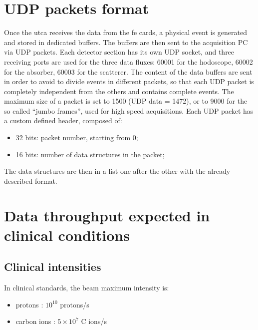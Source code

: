 \section{UDP packets format}\label{chapappA::sec::UDPpackForm}

Once the \gls{utca} receives the data from the \gls{fe} cards, a physical event is generated and stored in dedicated buffers. The buffers are then sent to the acquisition PC via UDP packets. Each detector section has its own UDP socket, and three receiving ports are used for the three data fluxes: 60001 for the hodoscope, 60002 for the absorber, 60003 for the scatterer. The content of the data buffers are sent in order to avoid to divide events in different packets, so that each UDP packet is completely independent from the others and contains complete events. The maximum size of a packet is set to 1500 (UDP data = 1472), or to 9000 for the so called \enquote{jumbo frames}, used for high speed acquisitions.\newline
Each UDP packet has a custom defined header, composed of:
\begin{itemize}
\item 32 bits: packet number, starting from 0;
\item 16 bits: number of data structures in the packet;
\end{itemize}
The data structures are then in a list one after the other with the already described format.

\section{Data throughput expected in clinical conditions}\label{chapappA::sec::dataThroughputClinic}

\subsection{Clinical intensities}\label{chapappA::subsec::clinIntensity}

In clinical standards, the beam maximum intensity is:
\begin{itemize}
	\item protons : $10^{10}$ protons/s
	\item carbon ions : $5\times10^7$ C ions/s\newline
\end {itemize}

